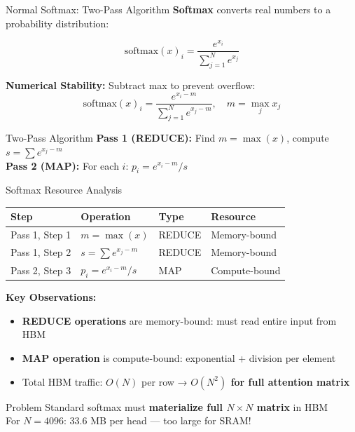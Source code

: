 \documentclass[aspectratio=169,10pt]{beamer}
\begin{document}
\begin{frame}{Normal Softmax: Two-Pass Algorithm}
    \textbf{Softmax} converts real numbers to a probability distribution:

    \vspace{0.1cm}
    $$\text{softmax}(x)_i = \frac{e^{x_i}}{\sum_{j=1}^{N} e^{x_j}}$$

    \vspace{0.1cm}
    \textbf{Numerical Stability:} Subtract max to prevent overflow:
    $$\text{softmax}(x)_i = \frac{e^{x_i - m}}{\sum_{j=1}^{N} e^{x_j - m}}, \quad m = \max_j x_j$$

    \vspace{0.2cm}
    \begin{block}{Two-Pass Algorithm}
        \textbf{Pass 1 (REDUCE):} Find $m = \max(x)$, compute $s = \sum e^{x_j - m}$ \\
        \textbf{Pass 2 (MAP):} For each $i$: $p_i = e^{x_i - m} / s$\
    \end{block}
\end{frame}

\begin{frame}{Softmax Resource Analysis}
    \begin{table}
        \centering
        \small
        \begin{tabular}{llll}
            \toprule
            \textbf{Step} & \textbf{Operation} & \textbf{Type} & \textbf{Resource} \\
            \midrule
            Pass 1, Step 1 & $m = \max(x)$ & REDUCE & Memory-bound \\
            Pass 1, Step 2 & $s = \sum e^{x_j - m}$ & REDUCE & Memory-bound \\
            Pass 2, Step 3 & $p_i = e^{x_i - m} / s$ & MAP & Compute-bound \\
            \bottomrule
        \end{tabular}
    \end{table}

    \vspace{0.5cm}
    \textbf{Key Observations:}
    \begin{itemize}
        \item \textbf{REDUCE operations} are memory-bound: must read entire input from HBM
        \item \textbf{MAP operation} is compute-bound: exponential + division per element
        \item Total HBM traffic: $O(N)$ per row → \textbf{$O(N^2)$ for full attention matrix}
    \end{itemize}

    \vspace{0.5cm}
    \begin{block}{Problem}
        Standard softmax must \textbf{materialize full $N \times N$ matrix} in HBM \\
        For $N=4096$: 33.6 MB per head — too large for SRAM!
    \end{block}
\end{frame}
\end{document}
